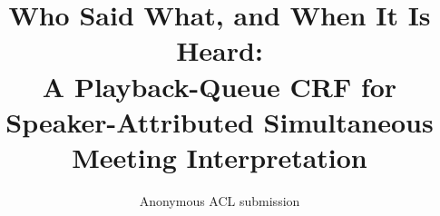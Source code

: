 \documentclass[11pt]{article}
\title{Who Said What, and When It Is Heard:\\
A Playback-Queue CRF for Speaker-Attributed Simultaneous Meeting Interpretation}
\author{Anonymous ACL submission}
\begin{document}
\maketitle











\clearpage
\appendix
\makeatletter
\renewcommand{\thesection}{\ifnum\c@section>26 A\@Alph{\numexpr\c@section-26\relax}\else\@Alph{\c@section}\fi}
\makeatother
\makeatletter\setlength{\@fptop}{0pt}\setlength{\@dblfptop}{0pt}\makeatother
\let\appendixsection\section
\renewcommand{\section}{\FloatBarrier\appendixsection}
\let\appendixsubsection\subsection
\renewcommand{\subsection}{\FloatBarrier\appendixsubsection}

\FloatBarrier
\end{document}

